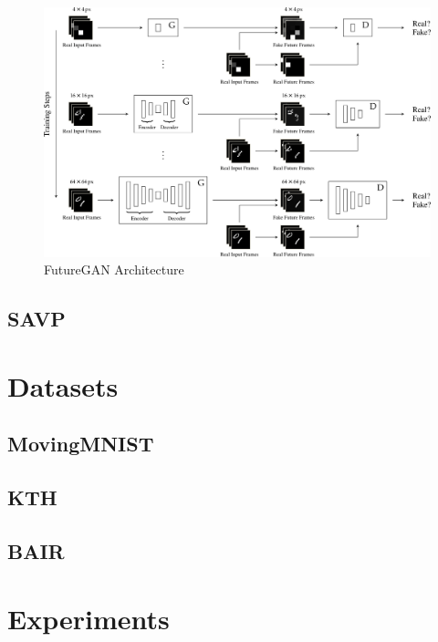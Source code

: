 \documentclass{scrartcl}
\begin{document}
\begin{figure}[H]
	\begin{center}
		\includegraphics[width=1\textwidth]{figures/futuregan_arch.png}
	\end{center}
	\caption{FutureGAN Architecture}
	\label{fig:futuregan_arch}
\end{figure}

\subsection{SAVP}
\label{subsec:savp}

\newpage
\section{Datasets}
\label{sec:datasets}

\subsection{MovingMNIST}
\label{subsec:mmnist}

\subsection{KTH}
\label{subsec:kth}

\subsection{BAIR}
\label{subsec:bair}

\newpage
\section{Experiments}
\label{sec:experiments}
\end{document}
